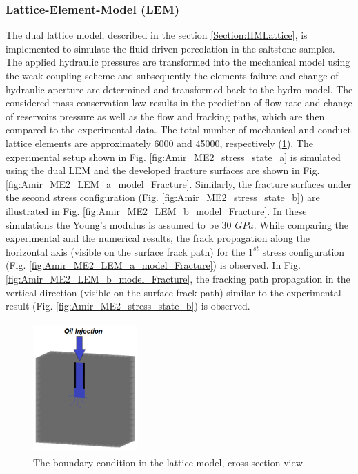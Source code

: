 \subsubsection*{Lattice-Element-Model (LEM)}

The dual lattice model, described in the section \ref{Section:HMLattice}, is implemented to simulate the fluid driven percolation in the saltstone samples. The applied hydraulic pressures are transformed into the mechanical model using the weak coupling scheme and subsequently the elements failure and change of hydraulic aperture are determined and transformed back to the hydro model. The considered mass conservation law results in the prediction of flow rate and change of reservoirs pressure as well as the flow and fracking paths, which are then compared to the experimental data. The total number of mechanical and conduct lattice elements are approximately 6000 and 45000, respectively (\ref{fig:Amir_ME2_LEM_a_model}).  The experimental setup shown in Fig. \ref{fig:Amir_ME2_stress_state_a} is simulated using  the dual LEM and the developed fracture surfaces are shown in Fig. \ref{fig:Amir_ME2_LEM_a_model_Fracture}. Similarly, the fracture surfaces under the second stress configuration (Fig. \ref{fig:Amir_ME2_stress_state_b}) are illustrated in Fig. \ref{fig:Amir_ME2_LEM_b_model_Fracture}. In these simulations the Young's modulus is assumed to be 30 $GPa$. While comparing the experimental and the numerical results, the frack propagation along the horizontal axis (visible on the surface frack path) for the $1^{st}$ stress configuration (Fig. \ref{fig:Amir_ME2_LEM_a_model_Fracture}) is observed. In Fig. \ref{fig:Amir_ME2_LEM_b_model_Fracture}, the fracking path propagation in the vertical direction (visible on the surface frack path) similar to the experimental result (Fig. \ref{fig:Amir_ME2_stress_state_b}) is observed.  

\begin{figure}[!ht]
\centering
\includegraphics[width=4cm,height=5cm]{figures/Amir_ME2_LEM_a_model.png}
\caption{The boundary condition in the lattice model, cross-section view}
\label{fig:Amir_ME2_LEM_a_model}
\end{figure}

